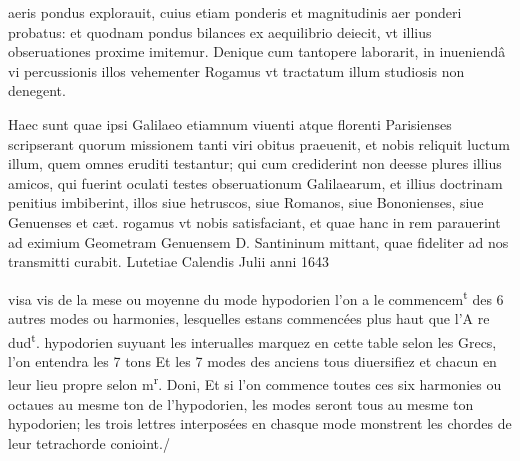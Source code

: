 \documentclass[11pt,a4paper]{article}
\begin{document}
aeris pondus explorauit, cuius etiam ponderis et magnitudinis aer ponderi probatus: et quodnam pondus bilances ex aequilibrio deiecit, vt illius obseruationes proxime imitemur. Denique cum tantopere laborarit, in inueniendâ vi percussionis illos vehementer Rogamus vt tractatum illum studiosis non denegent.

Haec sunt quae ipsi Galilaeo etiamnum viuenti atque florenti Parisienses scripserant quorum missionem tanti viri obitus praeuenit, et nobis reliquit luctum illum, quem omnes eruditi testantur; qui cum crediderint non deesse plures illius amicos, qui fuerint oculati testes obseruationum Galilaearum, et illius doctrinam penitius imbiberint, illos siue hetruscos, siue Romanos, siue Bononienses, siue Genuenses et cæt. rogamus vt nobis satisfaciant, et quae  hanc in rem parauerint ad eximium Geometram Genuensem D. Santininum mittant, quae fideliter ad nos transmitti curabit. Lutetiae Calendis Julii anni 1643


visa vis de la mese ou moyenne du mode hypodorien l'on a le commencem\textsuperscript{t} des 6 autres modes ou harmonies, lesquelles estans commencées plus haut que l'A re dud\textsuperscript{t}. hypodorien suyuant les interualles marquez en cette table selon les Grecs, l'on entendra les 7 tons Et les 7 modes des anciens tous diuersifiez et chacun en leur lieu propre selon m\textsuperscript{r}. Doni, Et si l'on commence toutes ces six harmonies ou octaues au mesme ton de l'hypodorien, les modes seront tous au mesme ton hypodorien; les trois lettres interposées en chasque mode monstrent les  chordes de leur tetrachorde conioint./
\end{document}
